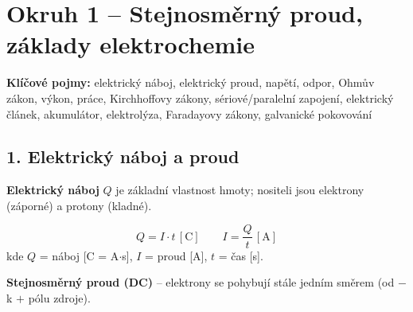 \documentclass[a4paper,10pt]{article}
\newcommand{\jednotka}[1]{\,[\mathrm{#1}]}
\begin{document}
\section*{\large Okruh 1 – Stejnosměrný proud, základy elektrochemie}

\begin{pojmybox}
\textbf{Klíčové pojmy:}
elektrický náboj, elektrický proud, napětí, odpor, Ohmův zákon, výkon, práce, Kirchhoffovy zákony,
sériové/paralelní zapojení, elektrický článek, akumulátor, elektrolýza, Faradayovy zákony, galvanické pokovování
\end{pojmybox}

\begin{vysvetlenibox}

\subsection*{1. Elektrický náboj a proud}

\textbf{Elektrický náboj} $Q$ je základní vlastnost hmoty; nositeli jsou elektrony (záporné) a protony (kladné).

\begin{vzorcebox}
\[
Q = I \cdot t \jednotka{C}
\quad\quad
I = \frac{Q}{t} \jednotka{A}
\]
kde $Q$ = náboj [C = A$\cdot$s], $I$ = proud [A], $t$ = čas [s].
\end{vzorcebox}

\textbf{Stejnosměrný proud (DC)} – elektrony se pohybují stále jedním směrem (od $-$ k $+$ pólu zdroje).

\medskip
\begin{center}
\end{center}


\end{vysvetlenibox}
\end{document}
